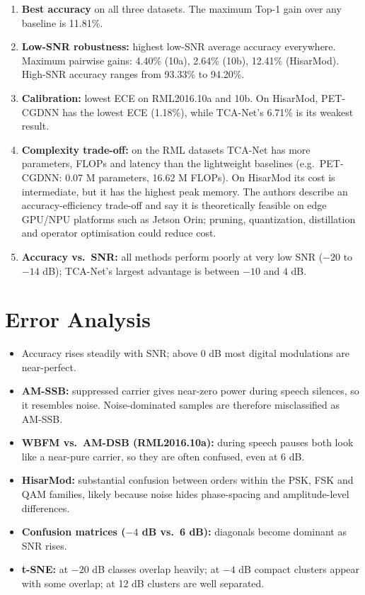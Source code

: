 \documentclass[11pt,a4paper]{article}
\begin{document}
\begin{enumerate}
  \item \textbf{Best accuracy} on all three datasets. The maximum Top-1 gain over any baseline is 11.81\%.
  \item \textbf{Low-SNR robustness:} highest low-SNR average accuracy everywhere. Maximum pairwise gains: 4.40\% (10a), 2.64\% (10b), 12.41\% (HisarMod). High-SNR accuracy ranges from 93.33\% to 94.20\%.
  \item \textbf{Calibration:} lowest ECE on RML2016.10a and 10b. On HisarMod, PET-CGDNN has the lowest ECE (1.18\%), while TCA-Net's 6.71\% is its weakest result.
  \item \textbf{Complexity trade-off:} on the RML datasets TCA-Net has more parameters, FLOPs and latency than the lightweight baselines (e.g.\ PET-CGDNN: 0.07 M parameters, 16.62 M FLOPs). On HisarMod its cost is intermediate, but it has the highest peak memory. The authors describe an accuracy-efficiency trade-off and say it is theoretically feasible on edge GPU/NPU platforms such as Jetson Orin; pruning, quantization, distillation and operator optimisation could reduce cost.
  \item \textbf{Accuracy vs.\ SNR:} all methods perform poorly at very low SNR ($-20$ to $-14$ dB); TCA-Net's largest advantage is between $-10$ and $4$ dB.
\end{enumerate}

\section{Error Analysis}

\begin{itemize}
  \item Accuracy rises steadily with SNR; above 0 dB most digital modulations are near-perfect.
  \item \textbf{AM-SSB:} suppressed carrier gives near-zero power during speech silences, so it resembles noise. Noise-dominated samples are therefore misclassified as AM-SSB.
  \item \textbf{WBFM vs.\ AM-DSB (RML2016.10a):} during speech pauses both look like a near-pure carrier, so they are often confused, even at 6 dB.
  \item \textbf{HisarMod:} substantial confusion between orders within the PSK, FSK and QAM families, likely because noise hides phase-spacing and amplitude-level differences.
  \item \textbf{Confusion matrices ($-4$ dB vs.\ 6 dB):} diagonals become dominant as SNR rises.
  \item \textbf{t-SNE:} at $-20$ dB classes overlap heavily; at $-4$ dB compact clusters appear with some overlap; at 12 dB clusters are well separated.
\end{itemize}
\end{document}
